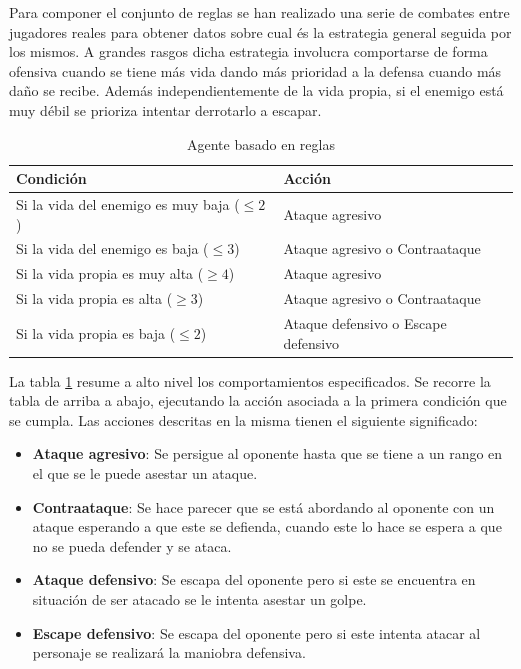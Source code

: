 \bigskip

Para componer el conjunto de reglas se han realizado una serie de combates entre jugadores reales para obtener datos sobre cual és la estrategia general seguida por los mismos. A grandes rasgos dicha estrategia involucra comportarse de forma ofensiva cuando se tiene más vida dando más prioridad a la defensa cuando más daño se recibe. Además independientemente de la vida propia, si el enemigo está muy débil se prioriza intentar derrotarlo a escapar.

\bigskip

\begin{table}
	\begin{center}
		\begin{tabular}{|l|l|}
			\hline
			\textbf{Condición} & \textbf{Acción}\\
			
			\hline
			Si la vida del enemigo es muy baja ($\leq2$) & Ataque agresivo\\
			
			\hline
			Si la vida del enemigo es baja ($\leq3$) & Ataque agresivo o Contraataque\\
			
			\hline
			Si la vida propia es muy alta ($\geq4$)& Ataque agresivo\\
			
			\hline
			Si la vida propia es alta ($\geq3$)& Ataque agresivo o Contraataque\\
			
			\hline
			Si la vida propia es baja ($\leq2$) & Ataque defensivo o Escape defensivo\\
			
			\hline
		\end{tabular}
		\caption{Agente basado en reglas}
		\label{reglas}
	\end{center}
\end{table}


La tabla \ref{reglas} resume a alto nivel los comportamientos especificados. Se recorre la tabla de arriba a abajo, ejecutando la acción asociada a la primera condición que se cumpla. Las acciones descritas en la misma tienen el siguiente significado:

\begin{itemize}
	\item \textbf{Ataque agresivo}: Se persigue al oponente hasta que se tiene a un rango en el que se le puede asestar un ataque.
	\item \textbf{Contraataque}: Se hace parecer que se está abordando al oponente con un ataque esperando a que este se defienda, cuando este lo hace se espera a que no se pueda defender y se ataca.
	\item \textbf{Ataque defensivo}: Se escapa del oponente pero si este se encuentra en situación de ser atacado se le intenta asestar un golpe.
	\item \textbf{Escape defensivo}: Se escapa del oponente pero si este intenta atacar al personaje se realizará la maniobra defensiva.
\end{itemize}

